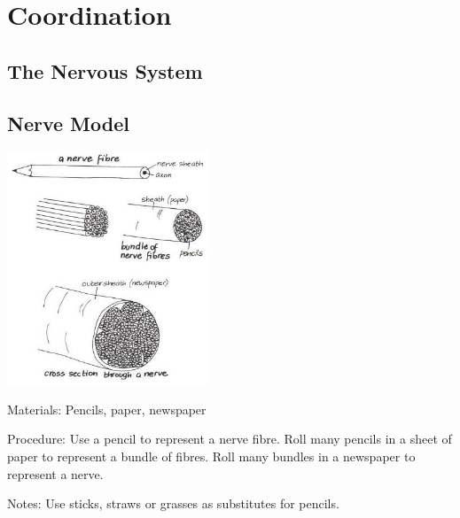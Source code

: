 \section{Coordination} 

\begin{multicols}{2}


\section*{The Nervous System} 


\subsection{Nerve Model} %

\begin{center}
\includegraphics[width=0.45\textwidth]{./img/vso/nerve-model.jpg}
\end{center}

\begin{description*}
\item[Materials:]{Pencils, paper, newspaper}
\item[Procedure:]{Use a pencil to represent a nerve fibre. Roll many pencils in a sheet of paper to represent a bundle of fibres. Roll many bundles in a newspaper to represent a nerve.}
\item[Notes:]{Use sticks, straws or grasses as substitutes for pencils.}
\end{description*}


\end{multicols}
